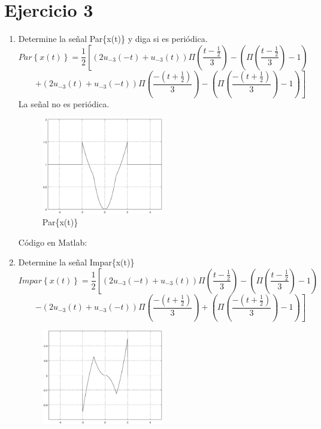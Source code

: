 \documentclass[10pt,a4paper]{report}
\begin{document}
\section{Ejercicio 3}
\begin{enumerate}
\item Determine la señal Par\{x(t)\} y diga si es periódica.
\[ Par\left\{ x\left( t \right)  \right\} =\frac { 1 }{ 2 } \left[ \left( 2u_{ -3 }\left( -t \right) +{ u }_{ -3 }\left( t \right)  \right) \Pi \left( \frac { t-\frac { 1 }{ 2 }  }{ 3 }  \right) -\left( \Pi \left( \frac { t-\frac { 1 }{ 2 }  }{ 3 }  \right) -1 \right) \right.\]
\[ \qquad \left.  + \left( 2u_{ -3 }\left( t \right) +{ u }_{ -3 }\left( -t \right)  \right) \Pi \left( \frac { -\left( t+\frac { 1 }{ 2 }  \right)  }{ 3 }  \right) -\left( \Pi \left( \frac { -\left( t+\frac { 1 }{ 2 }  \right)  }{ 3 }  \right) -1 \right) \right] \]
La señal no es periódica.
\begin{figure}[H]
  \begin{center}
    \includegraphics[width=0.5\textwidth]{./Ejercicio3/Par}
    \caption{Par\{x(t)\}}
    \label{fig:Par}
  \end{center}
\end{figure}
Código en Matlab:
    
\item Determine la señal Impar\{x(t)\} 
\[ Impar\left\{ x\left( t \right)  \right\} =\frac { 1 }{ 2 } \left[ \left( 2u_{ -3 }\left( -t \right) +{ u }_{ -3 }\left( t \right)  \right) \Pi \left( \frac { t-\frac { 1 }{ 2 }  }{ 3 }  \right) -\left( \Pi \left( \frac { t-\frac { 1 }{ 2 }  }{ 3 }  \right) -1 \right) \right.\]
\[ \qquad \left.  - \left( 2u_{ -3 }\left( t \right) +{ u }_{ -3 }\left( -t \right)  \right) \Pi \left( \frac { -\left( t+\frac { 1 }{ 2 }  \right)  }{ 3 }  \right) +\left( \Pi \left( \frac { -\left( t+\frac { 1 }{ 2 }  \right)  }{ 3 }  \right) -1 \right) \right] \]
\begin{figure}[H]
  \begin{center}
    \includegraphics[width=0.5\textwidth]{./Ejercicio3/Impar}

\end{center}
\end{figure}
\end{enumerate}
\end{document}
